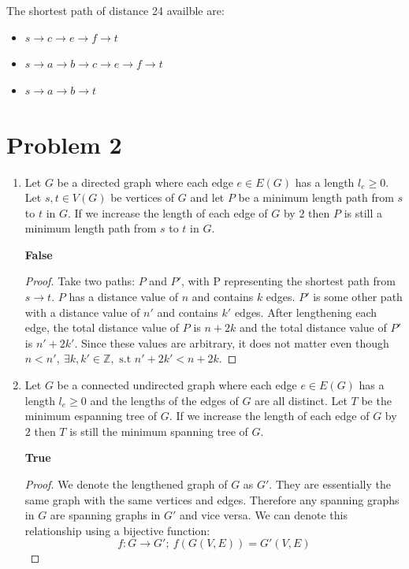 \documentclass[12pt]{article}
\newcommand{\Z}{\mathbb{Z}}
\newcommand{\st}{\text{ s.t }}
\begin{document}
The shortest path of distance 24 availble are:
\begin{itemize}
  \item[1)] $s \rightarrow c \rightarrow e \rightarrow f \rightarrow t$
  \item[2)] $s \rightarrow a \rightarrow b \rightarrow c \rightarrow e \rightarrow f \rightarrow t$
  \item[3)] $s \rightarrow a \rightarrow b \rightarrow t$
\end{itemize}




\section*{Problem 2}
\begin{enumerate}
\item [(a)] Let $G$ be a directed graph where each edge $e \in E(G)$ has a length $l_e \geq 0$. Let $s,t \in V(G)$ be vertices of $G$ and let $P$ be a minimum length path from $s$ to $t$ in $G$. If we increase the length of each edge of $G$ by $2$ then $P$ is still a minimum length path from $s$ to $t$ in $G$.
  
  \textbf{False}
  \begin{proof} Take two paths: $P$ and $P'$, with P representing the shortest path from $s \rightarrow t$. $P$ has a distance value of $n$ and contains $k$ edges. $P'$ is some other path with a distance value of $n'$ and contains $k'$ edges. After lengthening each edge, the total distance value of $P$ is $n + 2k$ and the total distance value of $P'$ is $n' + 2k'$. Since these values are arbitrary, it does not matter even though $n < n', ~\exists k, k' \in \Z, \st n' + 2k' < n + 2k$.
  \end{proof}
  
\item [(b)] Let $G$ be a connected undirected graph where each edge $e \in E(G)$ has a length $l_e \geq 0$ and the lengths of the edges of $G$ are all distinct. Let $T$ be the minimum espanning tree of $G$. If we increase the length of each edge of $G$ by $2$ then $T$ is still the minimum spanning tree of $G$.

  \textbf{True}
  \begin{proof} We denote the lengthened graph of $G$ as $G'$. They are essentially the same graph with the same vertices and edges. Therefore any spanning graphs in $G$ are spanning graphs in $G'$ and vice versa. We can denote this relationship using a bijective function: 
    \begin{equation}
    f: G \rightarrow G'; ~f(G(V, E)) = G'(V, E)
    \end{equation}


\end{proof}
\end{enumerate}
\end{document}

